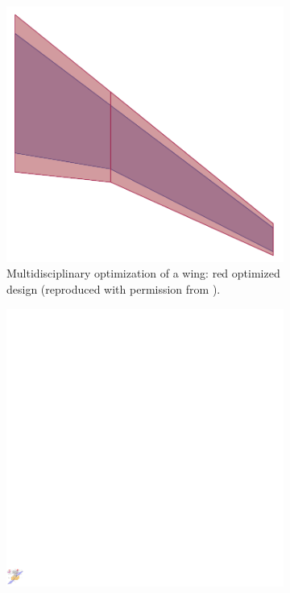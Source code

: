 \documentclass[12pt]{article}
\begin{document}
	\begin{figure}[tbh]
		\begin{subfigure}[t]{0.3\textwidth}
			\includegraphics[width=\columnwidth]{MDo_wing.png}%
			\caption{Multidisciplinary optimization of a wing: red optimized design (reproduced with permission from \cite{masColomer2021mdo}).}
			\label{fig:wing}
		\end{subfigure}\hfill
		\begin{subfigure}[t]{0.3\textwidth}
			\includegraphics[width=\columnwidth]{Codesign_satellite.pdf} 

\end{subfigure}
\end{figure}
\end{document}
